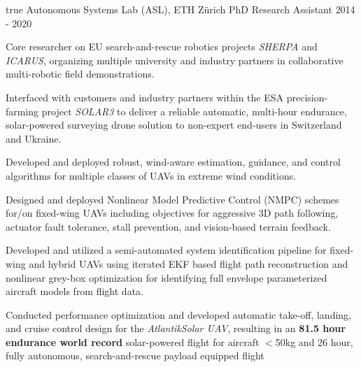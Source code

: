\begin{cventries}
{\begin{cvitems}
      \end{cvitems}
    } %
    {} %
    {true}
    {}
%
\cvexpentry
  	{Autonomous Systems Lab (ASL), ETH Z\"{u}rich} %
  	{PhD Research Assistant} %
    {} %
    {2014 - 2020} %
    {
      \begin{cvitems} %
      	\item Core researcher on EU search-and-rescue robotics projects \emph{SHERPA} and \emph{ICARUS}, organizing multiple university and industry partners in collaborative multi-robotic field demonstrations. 
		\item Interfaced with customers and industry partners within the ESA precision-farming project \emph{SOLAR3} to deliver a reliable automatic, multi-hour endurance, solar-powered surveying drone solution to non-expert end-users in Switzerland and Ukraine.      	
      	\item Developed and deployed robust, wind-aware estimation, guidance, and control algorithms for multiple classes of UAVs in extreme wind conditions.
      	\item Designed and deployed Nonlinear Model Predictive Control (NMPC) schemes for/on fixed-wing UAVs including objectives for aggressive 3D path following, actuator fault tolerance, stall prevention, and vision-based terrain feedback.
      	\item Developed and utilized a semi-automated system identification pipeline for fixed-wing and hybrid UAVs using iterated EKF based flight path reconstruction and nonlinear grey-box optimization for identifying full envelope parameterized aircraft models from flight data.
      	\item Conducted performance optimization and developed automatic take-off, landing, and cruise control design for the \emph{AtlantikSolar UAV}, resulting in an \textbf{81.5 hour endurance world record} solar-powered flight for aircraft $<$50kg  and 26 hour, fully autonomous, search-and-rescue payload equipped flight 

\end{cvitems}}
\end{cventries}
